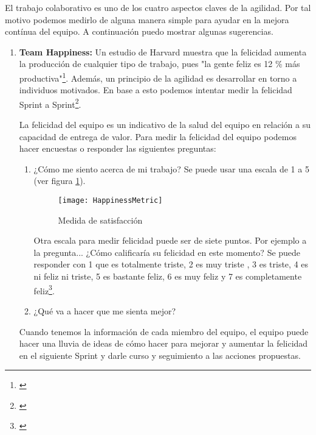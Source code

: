 El trabajo colaborativo es uno de los cuatro aspectos claves de la agilidad. Por tal motivo podemos medirlo de alguna manera simple para ayudar en la mejora contínua del equipo. A continuación puedo mostrar algunas sugerencias.

\begin{enumerate}

\item {\textbf{Team Happiness:}
Un estudio de Harvard muestra que la felicidad aumenta la producción de cualquier tipo de trabajo, pues "la gente feliz es 12 \% más productiva"\footnote{\cite{U-K-University-2014}}. Además, un principio de la agilidad es desarrollar en torno a individuos motivados. En base a esto podemos intentar medir la felicidad Sprint a Sprint\footnote{\cite{Jeff-2014}}. 

La felicidad del equipo es un indicativo de la salud del equipo en relación a su capacidad de entrega de valor. Para medir la felicidad del equipo podemos hacer encuestas o responder las siguientes preguntas:

  \begin{enumerate}
  \item {¿Cómo me siento acerca de mi trabajo? Se puede usar una escala de 1 a 5 (ver figura \ref{fig:HappinessMetric}). 
  
  \begin{figure}[h]
  \centering
  \texttt{[image: HappinessMetric]}
  \caption{Medida de satisfacción}
  \centering
  \label{fig:HappinessMetric} %
  \end{figure}
  \FloatBarrier

  Otra escala para medir felicidad puede ser de siete puntos. Por ejemplo a la pregunta... ¿Cómo calificaría su felicidad en este momento? Se puede responder con 1 que es totalmente triste, 2 es muy triste , 3 es triste, 4 es ni feliz ni triste, 5 es bastante feliz, 6 es muy feliz y 7 es completamente feliz\footnote{\cite{U-K-University-2014}}.
  }
  
  \item {¿Qué va a hacer que me sienta mejor?}
  \end{enumerate}

Cuando tenemos la información de cada miembro del equipo, el equipo puede hacer una lluvia de ideas de cómo hacer para mejorar y aumentar la felicidad en el siguiente Sprint y darle curso y seguimiento a las acciones propuestas.

}


\end{enumerate}
